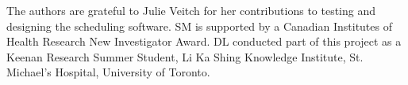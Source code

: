 The authors are grateful to Julie Veitch for her contributions to testing and
designing the scheduling software. SM is supported by a Canadian Institutes of
Health Research New Investigator Award. DL conducted part of this project as a
Keenan Research Summer Student, Li Ka Shing Knowledge Institute, St. Michael's
Hospital, University of Toronto.
